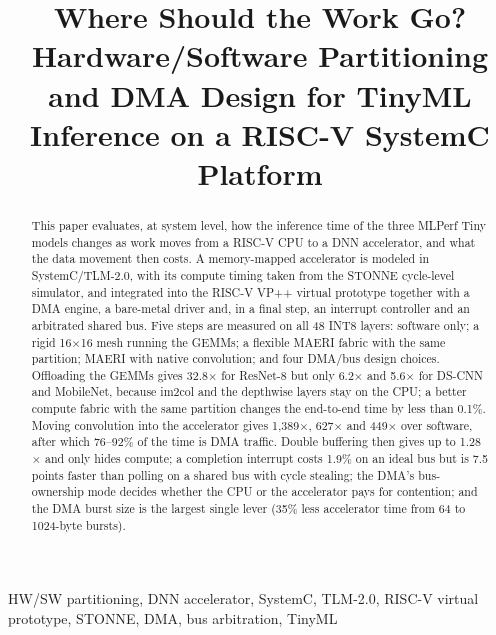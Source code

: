 \documentclass[conference]{IEEEtran}
\begin{document}
\title{Where Should the Work Go? Hardware/Software Partitioning and DMA Design for TinyML Inference on a RISC-V SystemC Platform}

\author{
}

\maketitle

\begin{abstract}
This paper evaluates, at system level, how the inference time of the three MLPerf Tiny models changes as work moves from a RISC-V CPU to a DNN accelerator, and what the data movement then costs. A memory-mapped accelerator is modeled in SystemC/TLM-2.0, with its compute timing taken from the STONNE cycle-level simulator, and integrated into the RISC-V VP++ virtual prototype together with a DMA engine, a bare-metal driver and, in a final step, an interrupt controller and an arbitrated shared bus. Five steps are measured on all 48 INT8 layers: software only; a rigid 16$\times$16 mesh running the GEMMs; a flexible MAERI fabric with the same partition; MAERI with native convolution; and four DMA/bus design choices. Offloading the GEMMs gives 32.8$\times$ for ResNet-8 but only 6.2$\times$ and 5.6$\times$ for DS-CNN and MobileNet, because im2col and the depthwise layers stay on the CPU; a better compute fabric with the same partition changes the end-to-end time by less than 0.1\%. Moving convolution into the accelerator gives 1{,}389$\times$, 627$\times$ and 449$\times$ over software, after which 76--92\% of the time is DMA traffic. Double buffering then gives up to 1.28$\times$ and only hides compute; a completion interrupt costs 1.9\% on an ideal bus but is 7.5 points faster than polling on a shared bus with cycle stealing; the DMA's bus-ownership mode decides whether the CPU or the accelerator pays for contention; and the DMA burst size is the largest single lever (35\% less accelerator time from 64 to 1024-byte bursts).
\end{abstract}

\begin{IEEEkeywords}
HW/SW partitioning, DNN accelerator, SystemC, TLM-2.0, RISC-V virtual prototype, STONNE, DMA, bus arbitration, TinyML
\end{IEEEkeywords}
\end{document}
